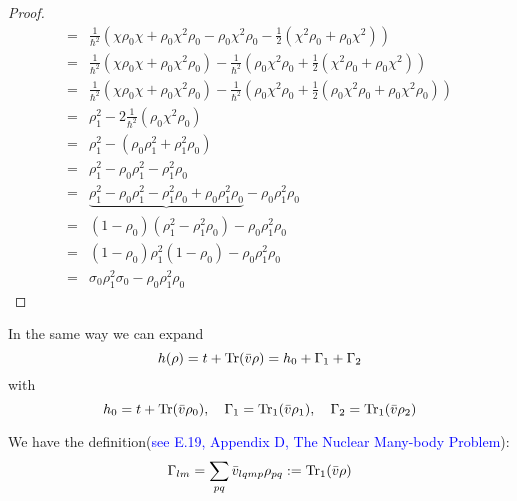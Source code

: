 \begin{proof}
\begin{equation}
\begin{aligned}
             =& \frac{1}{\hbar^2}\left( \chi\rho_0\chi + \rho_0\chi^2\rho_0 - \rho_0\chi^2\rho_0 - \frac{1}{2}(\chi^2\rho_0+\rho_0\chi^2) \right) \\ 
             =& \frac{1}{\hbar^2}\left( \chi\rho_0\chi + \rho_0\chi^2\rho_0\right) - \frac{1}{\hbar^2}\left( \rho_0\chi^2\rho_0 + \frac{1}{2}(\chi^2\rho_0+\rho_0\chi^2) \right) \\
             =& \frac{1}{\hbar^2}\left( \chi\rho_0\chi + \rho_0\chi^2\rho_0\right) - \frac{1}{\hbar^2}\left( \rho_0\chi^2\rho_0 + \frac{1}{2}(\rho_0\chi^2\rho_0+\rho_0\chi^2\rho_0) \right) \\
             =& \rho_1^2 - 2\frac{1}{\hbar^2}(\rho_0\chi^2\rho_0) \\
             =& \rho_1^2 - (\rho_0\rho_1^2 + \rho_1^2\rho_0) \\
             =& \rho_1^2 - \rho_0\rho_1^2 - \rho_1^2\rho_0 \\
             =& \underbrace{\rho_1^2 - \rho_0\rho_1^2 - \rho_1^2\rho_0 +\rho_0\rho_1^2\rho_0} - \rho_0\rho_1^2\rho_0 \\
             =& (1-\rho_0)(\rho_1^2-\rho_1^2\rho_0) - \rho_0\rho_1^2\rho_0 \\
             =& (1-\rho_0)\rho_1^2(1-\rho_0) - \rho_0\rho_1^2\rho_0\\
             =& \sigma_0\rho_1^2\sigma_0 - \rho_0\rho_1^2\rho_0
      \end{aligned}
    \end{equation}
  \end{proof}

  In the same way we can expand
  \begin{equation}
    h(\rho) = t + {\rm Tr}(\bar{v}\rho) = h_0 + \Gamma_1 + \Gamma_2 \label{tdhf47}
  \end{equation}
  with
  \begin{equation}
    h_0 = t + {\rm Tr}(\bar{v}\rho_0), \quad \Gamma_1 = {\rm Tr}_1(\bar{v}\rho_1), \quad \Gamma_2 = {\rm Tr}_1(\bar{v}\rho_2)    \label{48}
  \end{equation}
  \begin{note}
    We have the definition(\textcolor{blue}{see E.19, Appendix D, The Nuclear Many-body Problem}):
    \begin{equation}
      \Gamma_{lm} = \sum_{pq}\bar{v}_{lqmp}\rho_{pq}:= {\rm Tr}_1(\bar{v}\rho)  \label{tdhf49}
    \end{equation}
  \end{note}

